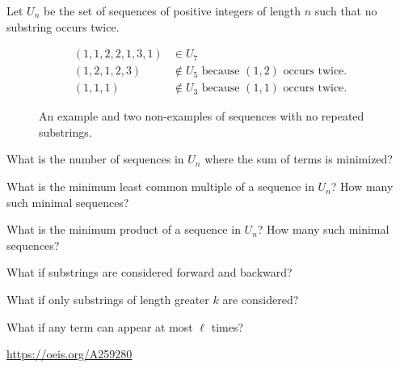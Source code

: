 \documentclass{article}
\begin{document}
  Let $U_n$ be the set of sequences of positive integers of length $n$ such that
  no substring occurs twice.
\begin{figure}[!h]
  \centering
  \begin{align*}
    (1, 1, 2, 2, 1, 3, 1) &\in U_7\\
    (1, 2, 1, 2, 3) &\not\in U_5 \text{ because } (1, 2) \text{ occurs twice.}\\
    (1, 1, 1) &\not\in U_3 \text{ because } (1, 1) \text{ occurs twice.}
  \end{align*}
  \caption{
    An example and two non-examples of sequences with no repeated substrings.
  }
\end{figure}

\begin{question}
  What is the number of sequences in $U_n$ where the sum of terms is minimized?
\end{question}

\begin{related}
  \item What is the minimum least common multiple of a sequence in $U_n$?
    How many such minimal sequences?
  \item What is the minimum product of a sequence in $U_n$?
    How many such minimal sequences?
  \item What if substrings are considered forward and backward?
  \item What if only substrings of length greater $k$ are considered?
  \item What if any term can appear at most $\ell$ times?
\end{related}

\begin{references}
  \item \url{https://oeis.org/A259280}
\end{references}
\end{document}
